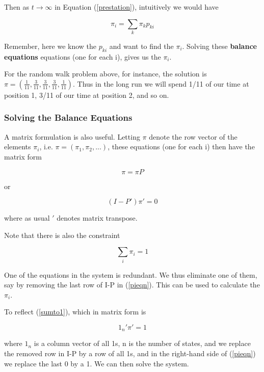 Then as $t\rightarrow \infty $ in Equation (\ref{prestation}),
intuitively we would have  

\begin{equation}
\label{balance}
\pi_{i}=\sum_{k}\pi_{k}p_{ki}
\end{equation}

Remember, here we know the $p_{ki}$ and want to find the $\pi_i$.
Solving these {\bf balance equations} equations (one for each i), gives
us the $\pi_i$.

For the random walk problem above, for instance, the solution is $\pi
=(\frac{1}{11},\frac{3}{11},\frac{3}{11},\frac{3}{11},\frac{1}{11})$.
Thus in the long run we will spend 1/11 of our time at position 1, 3/11
of our time at position 2, and so on.

\subsubsection{Solving the Balance Equations}
\label{solvbal}

A matrix formulation is also useful.  Letting $\pi $ denote the row
vector of the elements $\pi_{i}$, i.e.  $\pi = (\pi_1, \pi_2, ...)$,
these equations (one for each i) then have the matrix form

\begin{equation}
\label{eigen}
\pi =\pi P
\end{equation}


or

\begin{equation}
\label{pieqn}
(I-P') \pi' = 0
\end{equation}

where as usual $'$ denotes matrix transpose.

Note that there is also the constraint

\begin{equation}
\label{sumto1}
\sum_{i}\pi_{i}=1
\end{equation}

One of the equations in the system is redundant.   We thus eliminate one
of them, say by removing the last row of I-P in (\ref{pieqn}).  
This can be used to calculate the $\pi_{i}$.  

To reflect (\ref{sumto1}), which in matrix form is

\begin{equation}
1_n' \pi' = 1
\end{equation}

where $1_n$ is a column vector of all 1s, n is the number of states, and
we replace the removed row in I-P by a row of all 1s, and in the
right-hand side of (\ref{pieqn}) we replace the last 0 by a 1.  We can
then solve the system.  

